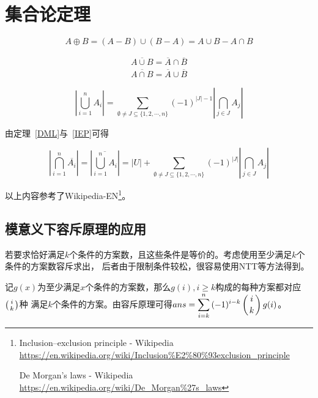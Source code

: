\section{集合论定理}
\begin{theorem}[对称差]
	\begin{displaymath}
		A\oplus B=(A-B)\cup(B-A)=A\cup B - A\cap B
	\end{displaymath}
\end{theorem}
\begin{theorem}\label{DML}
	\begin{eqnarray*}
		\overline{A\cup B}=\overline{A}\cap \overline{B} \\
		\overline{A\cap B}=\overline{A}\cup \overline{B}
	\end{eqnarray*}
\end{theorem}
\begin{theorem}\label{IEP}
	\begin{displaymath}
		\left|\bigcup_{i=1}^n{A_i}\right|=
		\sum_{\emptyset \neq J\subseteq \{1,2,\cdots,n\}}{(-1)^{|J|-1}
			\left|\bigcap_{j\in J}{A_j}\right|}
	\end{displaymath}
\end{theorem}

由定理~\ref{DML}与~\ref{IEP}可得

\begin{theorem}\label{ExDML}
	\begin{displaymath}
		\left|\bigcap_{i=1}^n\overline{A_i}\right|=
		\left|\overline{\bigcup_{i=1}^n{A_i}}\right|=
		|U|+\sum_{\emptyset \neq J\subseteq \{1,2,\cdots,n\}}{(-1)^{|J|}
			\left|\bigcap_{j\in J}{A_j}\right|}
	\end{displaymath}
\end{theorem}

以上内容参考了Wikipedia-EN\footnote{Inclusion–exclusion principle - Wikipedia\\
	\url{https://en.wikipedia.org/wiki/Inclusion\%E2\%80\%93exclusion\_principle}

	De Morgan's laws - Wikipedia\\
    \url{https://en.wikipedia.org/wiki/De\_Morgan\%27s\_laws}}。

\subsection{模意义下容斥原理的应用}
若要求恰好满足$k$个条件的方案数，且这些条件是等价的。考虑使用至少满足$k$个条件的方案数容斥求出，
后者由于限制条件较松，很容易使用NTT等方法得到。

记$g(x)$为至少满足$x$个条件的方案数，那么$g(i),i\geq k$构成的每种方案都对应$\left(i \atop k\right)$种
满足$k$个条件的方案。由容斥原理可得$ans=\displaystyle \sum_{i=k}^n{(-1)^{i-k}\left(i \atop k\right)g(i)}$。
